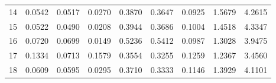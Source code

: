 \begin{anexosenv}
\begin{table}[htbp!]
\begin{tabular}{|l|l|l|l|l|l|l|l|l|}
14   & 0.0542   & 0.0517   & 0.0270               & 0.3870   & 0.3647   & 0.0925               & 1.5679  & 4.2615               \\
15   & 0.0522   & 0.0490   & 0.0208               & 0.3944   & 0.3686   & 0.1004               & 1.4518  & 4.3347               \\
16   & 0.0720   & 0.0699   & 0.0149               & 0.5236   & 0.5412   & 0.0987               & 1.3028  & 3.9475               \\
17   & 0.1334   & 0.0713   & 0.1579               & 0.3554   & 0.3255   & 0.1259               & 1.2367  & 3.4560               \\
18   & 0.0609   & 0.0595   & 0.0295               & 0.3710   & 0.3333   & 0.1146               & 1.3929  & 4.1101              \\\hline
\end{tabular}
\end{table}




\end{anexosenv}
